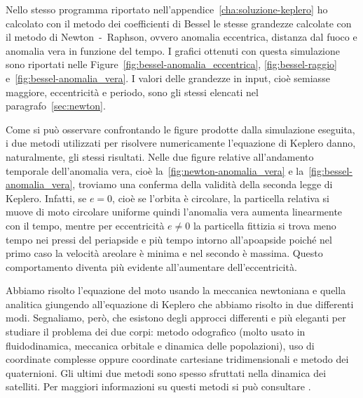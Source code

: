 Nello stesso programma riportato nell'appendice~\ref{cha:soluzione-keplero} ho
calcolato con il metodo dei coefficienti di Bessel le stesse grandezze calcolate
con il metodo di Newton~-~Raphson, ovvero anomalia eccentrica, distanza dal
fuoco e anomalia vera in funzione del tempo. I grafici ottenuti con questa
simulazione sono riportati nelle Figure~\ref{fig:bessel-anomalia_eccentrica},
\ref{fig:bessel-raggio} e~\ref{fig:bessel-anomalia_vera}. I valori delle
grandezze in input, cioè semiasse maggiore, eccentricità e periodo, sono gli
stessi elencati nel paragrafo~\ref{sec:newton}.

Come si può osservare confrontando le figure prodotte dalla simulazione
eseguita, i due metodi utilizzati per risolvere numericamente l'equazione di
Keplero danno, naturalmente, gli stessi risultati. Nelle due figure relative
all'andamento temporale dell'anomalia vera, cioè
la~\ref{fig:newton-anomalia_vera} e la~\ref{fig:bessel-anomalia_vera}, troviamo
una conferma della validità della seconda legge di Keplero. Infatti, se $e=0$,
cioè se l'orbita è circolare, la particella relativa si muove di moto circolare
uniforme quindi l'anomalia vera aumenta linearmente con il tempo, mentre per
eccentricità $e\neq 0$ la particella fittizia si trova meno tempo nei pressi del
periapside e più tempo intorno all'apoapside poiché nel primo caso la velocità
areolare è minima e nel secondo è massima. Questo comportamento diventa più
evidente all'aumentare dell'eccentricità.

Abbiamo risolto l'equazione del moto usando la meccanica newtoniana e quella
analitica giungendo all'equazione di Keplero che abbiamo risolto in due
differenti modi. Segnaliamo, però, che esistono degli approcci differenti e più
eleganti per studiare il problema dei due corpi: metodo odografico (molto usato
in fluidodinamica, meccanica orbitale e dinamica delle popolazioni), uso di
coordinate complesse oppure coordinate cartesiane tridimensionali e metodo dei
quaternioni. Gli ultimi due metodi sono spesso sfruttati nella dinamica dei
satelliti. Per maggiori informazioni su questi metodi si può consultare
\textcite{tan:orbital-motion}.

